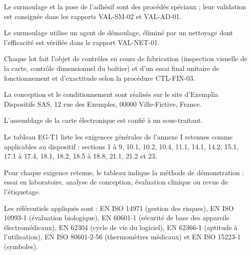 \documentclass[11pt,a4paper]{article}
\begin{document}
{\small Le surmoulage et la pose de l'adhésif sont des procédés spéciaux ; leur validation est consignée dans les rapports VAL-SM-02 et VAL-AD-01.}\par

{\small Le surmoulage utilise un agent de démoulage, éliminé par un nettoyage dont l'efficacité est vérifiée dans le rapport VAL-NET-01.}\par

{\small Chaque lot fait l'objet de contrôles en cours de fabrication (inspection visuelle de la carte, contrôle dimensionnel du boîtier) et d'un essai final unitaire de fonctionnement et d'exactitude selon la procédure CTL-FIN-03.}\par

\par{}\par

{\small La conception et le conditionnement sont réalisés sur le site d'Exemplia Dispositifs SAS, 12 rue des Exemples, 00000 Ville-Fictive, France.}\par

{\small L'assemblage de la carte électronique est confié à un sous-traitant.}\par

\par{}\par

{\small Le tableau EG-T1 liste les exigences générales de l'annexe I retenues comme applicables au dispositif : sections 1 à 9, 10.1, 10.2, 10.4, 11.1, 14.1, 14.2, 15.1, 17.1 à 17.4, 18.1, 18.2, 18.5 à 18.8, 21.1, 21.2 et 23.}\par

{\small Pour chaque exigence retenue, le tableau indique la méthode de démonstration : essai en laboratoire, analyse de conception, évaluation clinique ou revue de l'étiquetage.}\par

{\small Les référentiels appliqués sont : EN ISO 14971 (gestion des risques), EN ISO 10993-1 (évaluation biologique), EN 60601-1 (sécurité de base des appareils électromédicaux), EN 62304 (cycle de vie du logiciel), EN 62366-1 (aptitude à l'utilisation), EN ISO 80601-2-56 (thermomètres médicaux) et EN ISO 15223-1 (symboles).}\par

\par{}\par
\end{document}
